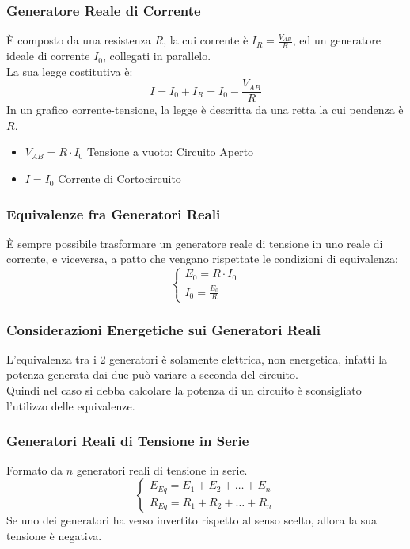 \documentclass[../main.tex]{subfiles}
\begin{document}
	\subsubsection{Generatore Reale di Corrente}
	È composto da una resistenza $R$, la cui corrente è $I_R = \frac{V_{AB}}{R}$, ed un generatore ideale di corrente $I_0$, collegati in parallelo.\\
	La sua legge costitutiva è:
	\[I = I_0 + I_R = I_0 - \frac{V_{AB}}{R}\]
	In un grafico corrente-tensione, la legge è descritta da una retta la cui pendenza è $R$.\\
	\begin{itemize}
		\item $V_{AB} = R \cdot I_0$ Tensione a vuoto: Circuito Aperto
		\item $I = I_0$ Corrente di Cortocircuito
	\end{itemize}
	\subsubsection{Equivalenze fra Generatori Reali}
	È sempre possibile trasformare un generatore reale di tensione in uno reale di corrente, e viceversa, a patto che vengano rispettate le condizioni di equivalenza:
	\[
		\begin{cases}
			E_0 = R \cdot I_0 \\
			I_0 = \frac{E_0}{R}
		\end{cases}
	\]
	\subsubsection{Considerazioni Energetiche sui Generatori Reali}
	L’equivalenza tra i 2 generatori è solamente elettrica, non  energetica, infatti la potenza generata dai due può variare a seconda del circuito.\\
	Quindi nel caso si debba calcolare la potenza di un circuito è sconsigliato l'utilizzo delle equivalenze.
	\subsubsection{Generatori Reali di Tensione in Serie}
	Formato da $n$ generatori reali di tensione in serie.
	\[
		\begin{cases}
			E_{Eq} = E_1 + E_2 + \dots + E_n \\
			R_{Eq} = R_1 + R_2 + \dots + R_n 
		\end{cases}
	\]
	Se uno dei generatori ha verso invertito rispetto al senso scelto, allora la sua tensione è negativa.
\end{document}
